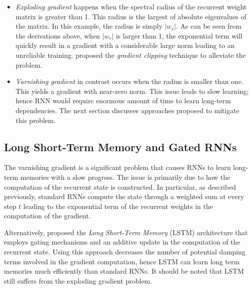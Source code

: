 %
%
%
\begin{itemize}
	\item \textit{Exploding gradient} happens when the spectral radius of the recurrent weight matrix is greater than 1. This radius is the largest of absolute eigenvalues of the matrix. In this example, the radius is simply $|w_r|$. As can be seen from the derivations above, when $|w_r|$ is larger than 1, the exponential term will quickly result in a gradient with a considerable large norm leading to an unreliable training. \citet{Pascanudifficultytrainingrecurrent2013} proposed the \textit{gradient clipping} technique to alleviate the problem.
	\item \textit{Varnishing gradient} in contrast occurs when the radius is smaller than one. This yields a gradient with near-zero norm. This issue leads to slow learning; hence RNN would require enormous amount of time to learn long-term dependencies. The next section discusses approaches proposed to mitigate this problem.
\end{itemize}



\subsection{Long Short-Term Memory and Gated RNNs}
The varnishing gradient is a significant problem that causes RNNs to learn long-term memories with a slow progress. The issue is primarily due to  how the computation of the recurrent state  is constructed. In particular, as described previously, standard RNNs compute the state through a weighted sum at every step $t$ leading to the exponential term of the recurrent weights in the computation of the gradient.

Alternatively, \citet{HochreiterLongshorttermmemory1997} proposed the \textit{Long Short-Term Memory} (LSTM) architecture that employs gating mechanisms and an additive update in the computation of the recurrent state. Using this approach  decreases the number of potential damping terms involved in the gradient computation, hence LSTM can learn long term memories much efficiently than standard RNNs. It should be noted that LSTM still suffers from the exploding gradient problem.

